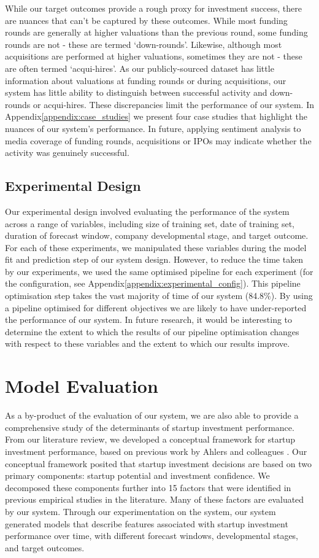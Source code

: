 \documentclass[../thesis/thesis.tex]{subfiles}
\begin{document}
While our target outcomes provide a rough proxy for investment success, there are nuances that can't be captured by these outcomes. While most funding rounds are generally at higher valuations than the previous round, some funding rounds are not - these are termed `down-rounds'. Likewise, although most acquisitions are performed at higher valuations, sometimes they are not - these are often termed `acqui-hires'. As our publicly-sourced dataset has little information about valuations at funding rounds or during acquisitions, our system has little ability to distinguish between successful activity and down-rounds or acqui-hires. These discrepancies limit the performance of our system. In Appendix\ref{appendix:case_studies} we present four case studies that highlight the nuances of our system's performance. In future, applying sentiment analysis to media coverage of funding rounds, acquisitions or IPOs may indicate whether the activity was genuinely successful.

\subsection{Experimental Design}

Our experimental design involved evaluating the performance of the system across a range of variables, including size of training set, date of training set, duration of forecast window, company developmental stage, and target outcome. For each of these experiments, we manipulated these variables during the model fit and prediction step of our system design. However, to reduce the time taken by our experiments, we used the same optimised pipeline for each experiment (for the configuration, see Appendix\ref{appendix:experimental_config}). This pipeline optimisation step takes the vast majority of time of our system (84.8\%). By using a pipeline optimised for different objectives we are likely to have under-reported the performance of our system. In future research, it would be interesting to determine the extent to which the results of our pipeline optimisation changes with respect to these variables and the extent to which our results improve.

\section{Model Evaluation}

As a by-product of the evaluation of our system, we are also able to provide a comprehensive study of the determinants of startup investment performance. From our literature review, we developed a conceptual framework for startup investment performance, based on previous work by Ahlers and colleagues \cite{ahlers2015}. Our conceptual framework posited that startup investment decisions are based on two primary components: startup potential and investment confidence. We decomposed these components further into 15 factors that were identified in previous empirical studies in the literature. Many of these factors are evaluated by our system. Through our experimentation on the system, our system generated models that describe features associated with startup investment performance over time, with different forecast windows, developmental stages, and target outcomes.
\end{document}
